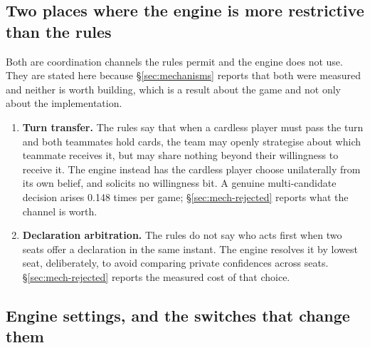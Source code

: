 \documentclass[11pt]{article}
\theoremstyle{definition}
\providecommand{\numTransferRate}{0.148}
\begin{document}
\subsection{Two places where the engine is more restrictive than the rules}
\label{sec:rules-gap}

Both are coordination channels the rules permit and the engine does not use.
They are stated here because \S\ref{sec:mechanisms} reports that both were
measured and neither is worth building, which is a result about the game and not
only about the implementation.

\begin{enumerate}
  \item \textbf{Turn transfer.} The rules say that when a cardless player must
        pass the turn and both teammates hold cards, the team may openly
        strategise about which teammate receives it, but may share nothing beyond
        their willingness to receive it. The engine instead has the cardless
        player choose unilaterally from its own belief, and solicits no
        willingness bit. A genuine multi-candidate decision arises
        \numTransferRate{} times per game; \S\ref{sec:mech-rejected} reports what
        the channel is worth.
  \item \textbf{Declaration arbitration.} The rules do not say who acts first
        when two seats offer a declaration in the same instant. The engine
        resolves it by lowest seat, deliberately, to avoid comparing private
        confidences across seats. \S\ref{sec:mech-rejected} reports the measured
        cost of that choice.
\end{enumerate}

\subsection{Engine settings, and the switches that change them}
\label{sec:rules-dialect}
\end{document}
